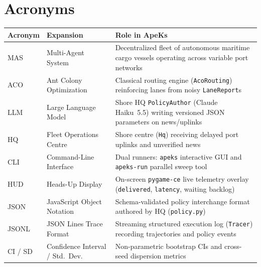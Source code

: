\documentclass[11pt,a4paper,oneside]{report}
\begin{document}
\clearpage{}
\chapter*{Acronyms}
















\noindent\begin{tabularx}{\textwidth}{@{}ll>{\raggedright\arraybackslash}X@{}}
\toprule
\textbf{Acronym} & \textbf{Expansion} & \textbf{Role in ApeKs} \\
\midrule
MAS & Multi-Agent System & Decentralized fleet of autonomous maritime cargo vessels operating across variable port networks \\
ACO & Ant Colony Optimization & Classical routing engine (\texttt{AcoRouting}) reinforcing lanes from noisy \texttt{LaneReport}s \\
LLM & Large Language Model & Shore HQ \texttt{PolicyAuthor} (Claude Haiku~5.5) writing versioned JSON parameters on news/uplinks \\
HQ & Fleet Operations Centre & Shore centre (\texttt{Hq}) receiving delayed port uplinks and unverified news \\
CLI & Command-Line Interface & Dual runners: \texttt{apeks} interactive GUI and \texttt{apeks-run} parallel sweep tool \\
HUD & Heads-Up Display & On-screen \texttt{pygame-ce} live telemetry overlay (\texttt{delivered}, \texttt{latency}, waiting backlog) \\
JSON & JavaScript Object Notation & Schema-validated policy interchange format authored by HQ (\texttt{policy.py}) \\
JSONL & JSON Lines Trace Format & Streaming structured execution log (\texttt{Tracer}) recording trajectories and policy events \\
CI / SD & Confidence Interval / Std.\ Dev. & Non-parametric bootstrap CIs and cross-seed dispersion metrics \\
\bottomrule
\end{tabularx}
\clearpage


\end{document}
